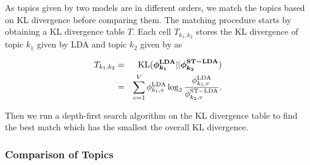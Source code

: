 As topics given by two models are in different orders, we match the topics based on KL divergence before comparing them. The matching procedure starts by obtaining a KL divergence table $T$. Each cell $T_{k_1,k_2}$ stores the KL divergence of topic $k_1$ given by LDA and topic $k_2$ given by \stlda as

\begin{eqnarray}
T_{k_1,k_2}&=&\mathrm{KL}(\bm{\phi_{k_1}^\mathrm{LDA}}||\bm{\phi_{k_2}^\mathrm{ST-LDA}})\\
&=&\sum_{v=1}^{V} \phi_{k_1,v}^{\mathrm{LDA}} \log_2 \frac{\phi_{k_1,v}^{\mathrm{LDA}}}{\phi_{k_2,v}^{\mathrm{ST-LDA}}}.
\end{eqnarray}

Then we run a depth-first search algorithm on the KL divergence table to find the best match which has the smallest the overall KL divergence.

\subsubsection{Comparison of Topics}

